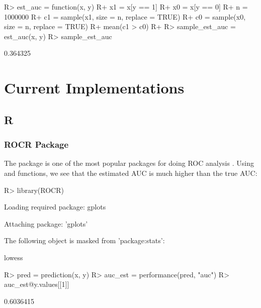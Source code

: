 \documentclass[article]{jss}
\begin{document}
\begin{CodeChunk}

\begin{CodeInput}
R> est_auc = function(x, y) {
R+   x1 = x[y == 1]
R+   x0 = x[y == 0]
R+   n = 1000000
R+   c1 = sample(x1, size = n, replace = TRUE)
R+   c0 = sample(x0, size = n, replace = TRUE)
R+   mean(c1 > c0)
R+ }
R> sample_est_auc = est_auc(x, y)
R> sample_est_auc
\end{CodeInput}

\begin{CodeOutput}
[1] 0.364325
\end{CodeOutput}
\end{CodeChunk}

\section{Current Implementations}\label{current-implementations}

\subsection{R}\label{r}

\subsubsection{ROCR Package}\label{rocr-package}

The  package is one of the most popular packages for doing ROC
analysis \cite{ROCR}. Using  and 
functions, we see that the estimated AUC is much higher than the true
AUC:

\begin{CodeChunk}

\begin{CodeInput}
R> library(ROCR)
\end{CodeInput}

\begin{CodeOutput}
Loading required package: gplots
\end{CodeOutput}

\begin{CodeOutput}

Attaching package: 'gplots'
\end{CodeOutput}

\begin{CodeOutput}
The following object is masked from 'package:stats':

    lowess
\end{CodeOutput}

\begin{CodeInput}
R> pred = prediction(x, y)
R> auc_est = performance(pred, "auc")
R> auc_est@y.values[[1]]
\end{CodeInput}

\begin{CodeOutput}
[1] 0.6036415
\end{CodeOutput}
\end{CodeChunk}
\end{document}
